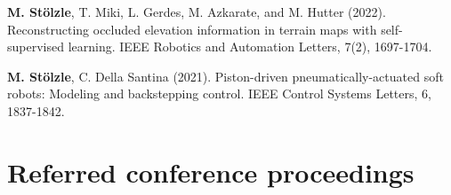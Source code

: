 \begin{enumerate}
{    \item \textbf{M. Stölzle}, T. Miki, L. Gerdes, M. Azkarate, and M. Hutter (2022). Reconstructing occluded elevation information in terrain maps with self-supervised learning. IEEE Robotics and Automation Letters, 7(2), 1697-1704.
    \item[\faFileTextO \, \stepcounter{enumi}\arabic{enumi}.] \textbf{M. Stölzle}, C. Della Santina (2021). Piston-driven pneumatically-actuated soft robots: Modeling and backstepping control. IEEE Control Systems Letters, 6, 1837-1842.
}\end{enumerate}


\section*{Referred conference proceedings}

